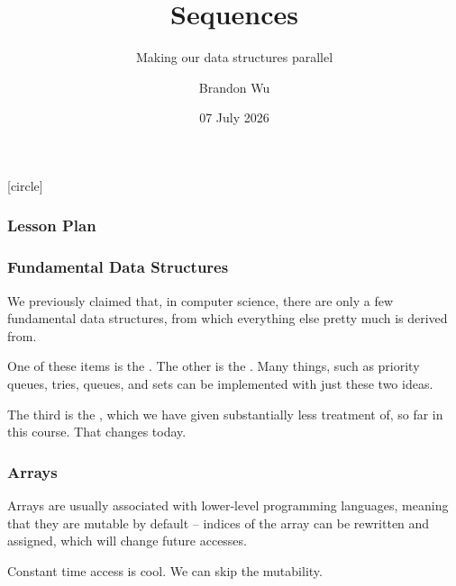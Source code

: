 \documentclass[aspectratio=169]{beamer}
\title{Sequences} %
\subtitle{Making our data structures parallel} %
\date{07 July 2026} %
\author{Brandon Wu} %
\newif\ifcolorlambda
\begin{document}
\ifweb
    \renewcommand{\pause}{}
\fi

[circle]

{
\begin{frame}[plain]
    \colorlambdatrue
    \titlepage
\end{frame}
}


\begin{frame}[fragile]
  \frametitle{Lesson Plan}

  \tableofcontents
\end{frame}


\begin{frame}[fragile]
  \frametitle{Fundamental Data Structures}

  We previously claimed that, in computer science, there are only a few
  fundamental data structures, from which everything else pretty much
  is derived from.

  \pause
  \vspace{\fill}

  One of these items is the . The other is the . Many
  things, such as priority queues, tries, queues, and sets can be implemented
  with just these two ideas.

  \pause
  \vspace{\fill}

  The third is the , which we have given substantially less
  treatment of, so far in this course. That changes today.
\end{frame}

\begin{frame}[fragile]
  \frametitle{Arrays}


  \pause
  \vspace{\fill}

  Arrays are usually associated with lower-level programming languages, meaning
  that they are mutable by default -- indices of the array can be rewritten and
  assigned, which will change future accesses.

  \pause
  \vspace{\fill}

  Constant time access is cool. We can skip the mutability.
\end{frame}
\end{document}
